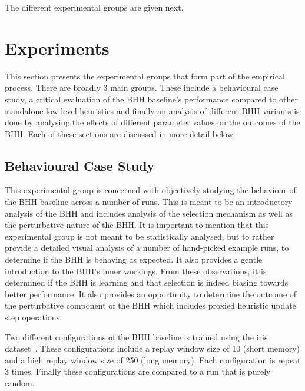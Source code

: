 The different experimental groups are given next.







\section{Experiments}
\label{sec:methodology:experiments}

This section presents the experimental groups that form part of the empirical process. There are broadly 3 main groups. These include a behavioural case study, a critical evaluation of the \ac{BHH} baseline's performance compared to other standalone low-level heuristics and finally an analysis of different \ac{BHH} variants is done by analysing the effects of different parameter values on the outcomes of the \ac{BHH}. Each of these sections are discussed in more detail below.


\subsection{Behavioural Case Study}
\label{sec:methodology:experiments:case_study}

This experimental group is concerned with objectively studying the behaviour of the \ac{BHH} baseline across a number of runs. This is meant to be an introductory analysis of the \ac{BHH} and includes analysis of the selection mechanism as well as the perturbative nature of the \ac{BHH}. It is important to mention that this experimental group is not meant to be statistically analysed, but to rather provide a detailed visual analysis of a number of hand-picked example runs, to determine if the \ac{BHH} is behaving as expected. It also provides a gentle introduction to the \ac{BHH}'s inner workings. From these observations, it is determined if the \ac{BHH} is learning and that selection is indeed biasing towards better performance. It also provides an opportunity to determine the outcome of the perturbative component of the \ac{BHH} which includes proxied heuristic update step operations.

Two different configurations of the \ac{BHH} baseline is trained using the iris dataset~\cite{ref:fisher:1936}. These configurations include a replay window size of 10 (short memory) and a high replay window size of 250 (long memory). Each configuration is repeat 3 times. Finally these configurations are compared to a run that is purely random.

